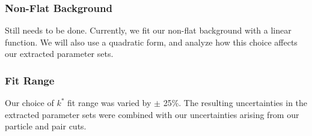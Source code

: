 \documentclass[../AnalysisNoteJBuxton.tex]{subfiles}
\begin{document}
\subsubsection{Non-Flat Background}
\label{SysErrsXiKch:NonFlatBgd}

Still needs to be done.  Currently, we fit our non-flat background with a linear function.  We will also use a quadratic form, and analyze how this choice affects our extracted parameter sets.

\subsubsection{Fit Range}
\label{SysErrsXiKch:FitRange}

Our choice of $k^{*}$ fit range was varied by $\pm$ 25\%.  The resulting uncertainties in the extracted parameter sets were combined with our uncertainties arising from our particle and pair cuts.
\end{document}
